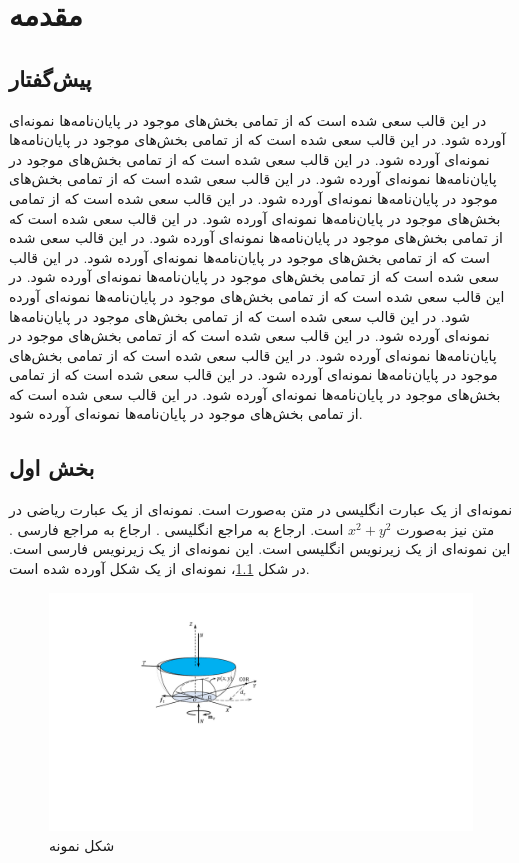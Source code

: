 \chapter{مقدمه}
\section{پیش‌گفتار}
در این قالب سعی شده است که از تمامی بخش‌های موجود در پایان‌نامه‌ها نمونه‌ای آورده شود. در این قالب سعی شده است که از تمامی بخش‌های موجود در پایان‌نامه‌ها نمونه‌ای آورده شود. در این قالب سعی شده است که از تمامی بخش‌های موجود در پایان‌نامه‌ها نمونه‌ای آورده شود. در این قالب سعی شده است که از تمامی بخش‌های موجود در پایان‌نامه‌ها نمونه‌ای آورده شود. در این قالب سعی شده است که از تمامی بخش‌های موجود در پایان‌نامه‌ها نمونه‌ای آورده شود. در این قالب سعی شده است که از تمامی بخش‌های موجود در پایان‌نامه‌ها نمونه‌ای آورده شود. در این قالب سعی شده است که از تمامی بخش‌های موجود در پایان‌نامه‌ها نمونه‌ای آورده شود. در این قالب سعی شده است که از تمامی بخش‌های موجود در پایان‌نامه‌ها نمونه‌ای آورده شود. در این قالب سعی شده است که از تمامی بخش‌های موجود در پایان‌نامه‌ها نمونه‌ای آورده شود. در این قالب سعی شده است که از تمامی بخش‌های موجود در پایان‌نامه‌ها نمونه‌ای آورده شود. در این قالب سعی شده است که از تمامی بخش‌های موجود در پایان‌نامه‌ها نمونه‌ای آورده شود. در این قالب سعی شده است که از تمامی بخش‌های موجود در پایان‌نامه‌ها نمونه‌ای آورده شود. در این قالب سعی شده است که از تمامی بخش‌های موجود در پایان‌نامه‌ها نمونه‌ای آورده شود. در این قالب سعی شده است که از تمامی بخش‌های موجود در پایان‌نامه‌ها نمونه‌ای آورده شود.
\section{بخش اول}
نمونه‌ای از یک عبارت انگلیسی در متن به‌صورت
است. نمونه‌ای از یک عبارت ریاضی در متن نیز به‌صورت
$x^2 + y^2$
است. ارجاع به مراجع انگلیسی
\cite{Fakhari2015a,Lewis2003}.
ارجاع به مراجع فارسی
\cite{Fakhari2015b,HadianThesis2008}.
این نمونه‌ای از یک زیرنویس انگلیسی%
است. این نمونه‌ای از یک زیرنویس فارسی%
است. در شکل
\ref{Fig:SampleFigure1}،
نمونه‌ای از یک شکل آورده شده است. 

\begin{figure}[!htb]
\centering
\includegraphics[scale=1]{Figures/SampleFigure.pdf}
\caption{شکل نمونه}
\label{Fig:SampleFigure1}
\end{figure}

